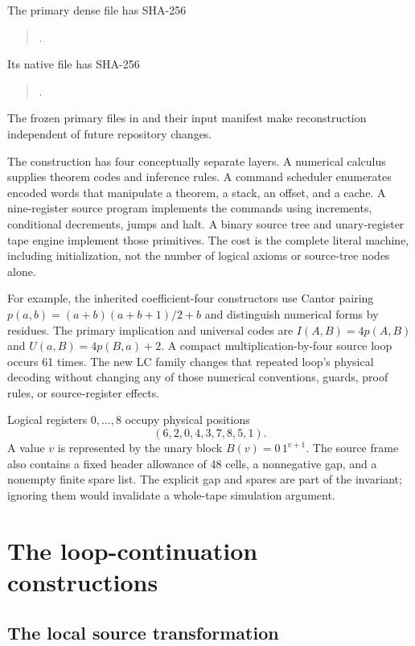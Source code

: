 \documentclass[11pt,a4paper]{article}
\begin{document}
The primary dense file has SHA-256
\begin{quote}\small
{}.
\end{quote}
Its native file has SHA-256
\begin{quote}\small
{}.
\end{quote}
The frozen primary files in  and their input
manifest make reconstruction independent of future repository changes.

The construction has four conceptually separate layers. A numerical
calculus supplies theorem codes and inference rules. A command scheduler
enumerates encoded words that manipulate a theorem, a stack, an offset,
and a cache. A nine-register source program implements the commands using
increments, conditional decrements, jumps and halt. A binary source tree
and unary-register tape engine implement those primitives. The cost is
the complete literal machine, including initialization, not the number
of logical axioms or source-tree nodes alone.

For example, the inherited coefficient-four constructors use Cantor
pairing $p(a,b)=(a+b)(a+b+1)/2+b$ and distinguish numerical forms by
residues. The primary implication and universal codes are
$I(A,B)=4p(A,B)$ and $U(a,B)=4p(B,a)+2$. A compact multiplication-by-four
source loop occurs 61 times. The new LC family changes that repeated
loop's physical decoding without changing any of those numerical
conventions, guards, proof rules, or source-register effects.

Logical registers $0,\ldots,8$ occupy physical positions
\[
(6,2,0,4,3,7,8,5,1).
\]
A value $v$ is represented by the unary block $B(v)=0\,1^{v+1}$. The
source frame also contains a fixed header allowance of 48 cells, a
nonnegative gap, and a nonempty finite spare list. The explicit gap and
spares are part of the invariant; ignoring them would invalidate a
whole-tape simulation argument.

\section{The loop-continuation constructions}
\label{sec:construction}

\subsection{The local source transformation}
\end{document}
